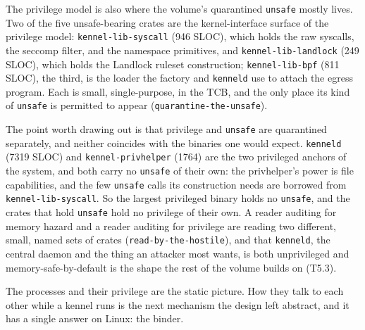 The privilege model is also where the volume's quarantined
\texttt{unsafe} mostly lives. Two of the five unsafe-bearing crates are
the kernel-interface surface of the privilege model:
\texttt{kennel-lib-syscall} (946 SLOC), which holds the raw syscalls,
the seccomp filter, and the namespace primitives, and
\texttt{kennel-lib-landlock} (249 SLOC), which holds the Landlock
ruleset construction; \texttt{kennel-lib-bpf} (811 SLOC), the third, is
the loader the factory and \texttt{kenneld} use to attach the egress
program. Each is small, single-purpose, in the TCB, and the only place
its kind of \texttt{unsafe} is permitted to appear
(\texttt{quarantine-the-unsafe}).

The point worth drawing out is that privilege and \texttt{unsafe} are
quarantined separately, and neither coincides with the binaries one
would expect. \texttt{kenneld} (7319 SLOC) and
\texttt{kennel-privhelper} (1764) are the two privileged anchors of the
system, and both carry no \texttt{unsafe} of their own: the privhelper's
power is file capabilities, and the few \texttt{unsafe} calls its
construction needs are borrowed from \texttt{kennel-lib-syscall}. So the
largest privileged binary holds no \texttt{unsafe}, and the crates that
hold \texttt{unsafe} hold no privilege of their own. A reader auditing
for memory hazard and a reader auditing for privilege are reading two
different, small, named sets of crates (\texttt{read-by-the-hostile}),
and that \texttt{kenneld}, the central daemon and the thing an attacker
most wants, is both unprivileged and memory-safe-by-default is the shape
the rest of the volume builds on (T5.3).

The processes and their privilege are the static picture. How they talk
to each other while a kennel runs is the next mechanism the design left
abstract, and it has a single answer on Linux: the binder.
